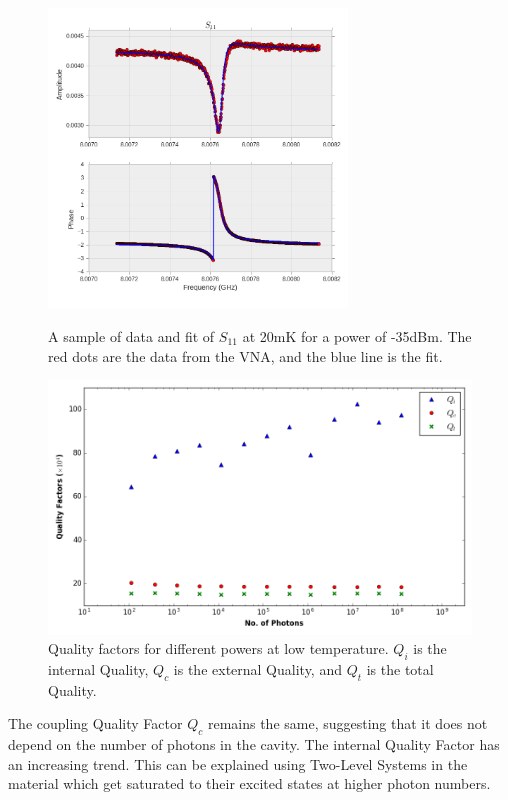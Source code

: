 \begin{figure}
\centering
\includegraphics[width=300px]{Figures/s11fit.png}
\decoRule
\caption[Sample $S_{11}$ fit]{A sample of data and fit of $S_{11}$ at 20mK for a power of -35dBm. The red dots are the data from the VNA, and the blue line is the fit.}
\label{fig:fit}

\centering
\includegraphics[width=\linewidth]{Figures/cold_qualities.png}
\decoRule
\caption[Quality Factors for different powers at low temperature]{Quality factors for different powers at low temperature. $Q_i$ is the internal Quality, $Q_c$ is the external Quality, and $Q_t$ is the total Quality.}
\label{fig:cold qualities}
\end{figure}

The coupling Quality Factor $Q_c$ remains the same, suggesting that it does not depend on the number of photons in the cavity. The internal Quality Factor has an increasing trend. This can be explained using Two-Level Systems in the material which get saturated to their excited states at higher photon numbers\cite{Gao2007}.
